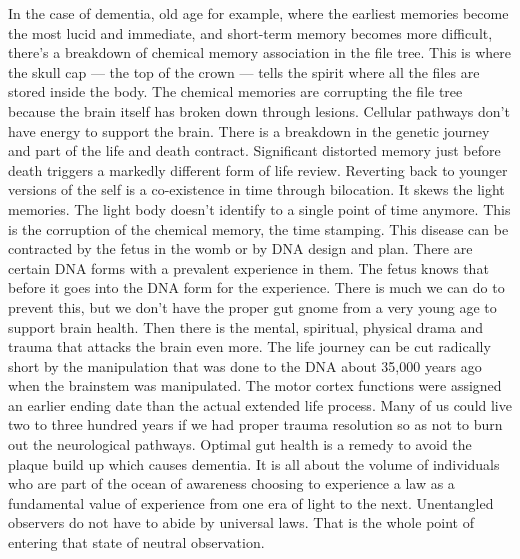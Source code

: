 In the case of dementia, old age for example, where the earliest
memories become the most lucid and immediate, and short-term memory
becomes more difficult, there's a breakdown of chemical memory
association in the file tree. This is where the skull cap --- the top of
the crown --- tells the spirit where all the files are stored inside the
body. The chemical memories are corrupting the file tree because the
brain itself has broken down through lesions. Cellular pathways don't
have energy to support the brain. There is a breakdown in the genetic
journey and part of the life and death contract. Significant distorted
memory just before death triggers a markedly different form of life
review. Reverting back to younger versions of the self is a co-existence
in time through bilocation. It skews the light memories. The light body
doesn't identify to a single point of time anymore. This is the
corruption of the chemical memory, the time stamping. This disease can
be contracted by the fetus in the womb or by DNA design and plan. There
are certain DNA forms with a prevalent experience in them. The fetus
knows that before it goes into the DNA form for the experience. There is
much we can do to prevent this, but we don't have the proper gut gnome
from a very young age to support brain health. Then there is the mental,
spiritual, physical drama and trauma that attacks the brain even more.
The life journey can be cut radically short by the manipulation that was
done to the DNA about 35,000 years ago when the brainstem was
manipulated. The motor cortex functions were assigned an earlier ending
date than the actual extended life process. Many of us could live two to
three hundred years if we had proper trauma resolution so as not to burn
out the neurological pathways. Optimal gut health is a remedy to avoid
the plaque build up which causes dementia. It is all about the volume of
individuals who are part of the ocean of awareness choosing to
experience a law as a fundamental value of experience from one era of
light to the next. Unentangled observers do not have to abide by
universal laws. That is the whole point of entering that state of
neutral observation.

